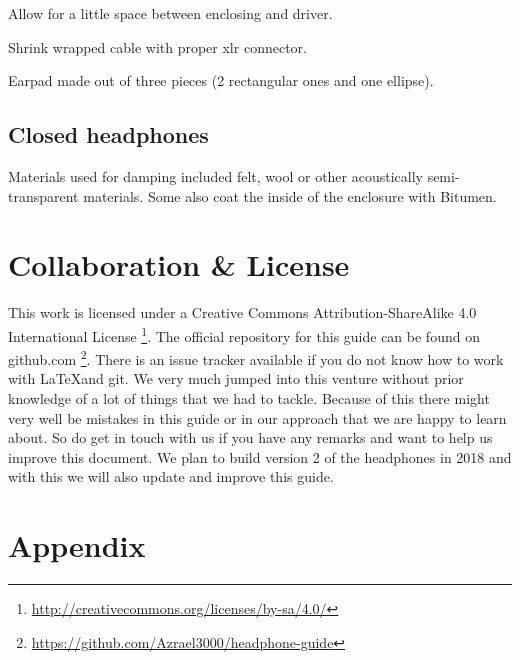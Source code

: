 \documentclass{article}
\begin{document}
Allow for a little space between enclosing and driver.

Shrink wrapped cable with proper xlr connector.

Earpad made out of three pieces (2 rectangular ones and one ellipse).

\subsection{Closed headphones}
\label{s:future:closed}

Materials used for damping included felt, wool or other acoustically semi-transparent materials. Some also coat the inside of the enclosure with Bitumen.

\section{Collaboration \& License}
This work is licensed under a Creative Commons Attribution-ShareAlike 4.0 International License \footnote{\url{http://creativecommons.org/licenses/by-sa/4.0/}}. The official repository for this guide can be found on github.com \footnote{\url{https://github.com/Azrael3000/headphone-guide}}. There is an issue tracker available if you do not know how to work with \LaTeX and git. We very much jumped into this venture without prior knowledge of a lot of things that we had to tackle. Because of this there might very well be mistakes in this guide or in our approach that we are happy to learn about. So do get in touch with us if you have any remarks and want to help us improve this document. We plan to build version 2 of the headphones in 2018 and with this we will also update and improve this guide.

\section{Appendix}
\label{s:app}
\end{document}
